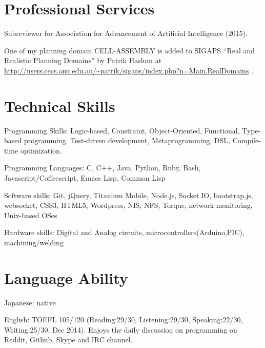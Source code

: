 \documentclass[letterpaper]{article}
\begin{document}
\renewcommand{\refname}{Publications}

\let\uline\relax
\nocite{Asai2014}
\nocite{Asai2014b}
\nocite{Asai2015}




\section{Professional Services}

Subreviewer for Association for Advancement of Artificial Intelligence (2015).

One of my planning domain CELL-ASSEMBLY is added to SIGAPS ``Real and
Realistic Planning Domains'' by Patrik Haslum at
\url{http://users.cecs.anu.edu.au/~patrik/sigaps/index.php?n=Main.RealDomains}
.

\section{Technical Skills}

\begin{CV}
 \item[Programming Skills:] Logic-based, Constraint, Object-Oriented,
 Functional, Type-based programming. Test-driven development, Metaprogramming, DSL, Compile-time optimization.
 \item[Programming Languages:] C, C++, Java, Python, Ruby, Bash,
 Javascript/Coffeescript, Emacs Lisp, Common Lisp
 \item[Software skills:] Git, jQuery, Titanium Mobile,
 Node.js, Socket.IO, bootstrap.js, websocket, CSS3, HTML5, Wordpress, NIS, NFS,
 Torque, network monitoring, Unix-based OSes
 \item[Hardware skills:] Digital and Analog circuits, microcontrollers(Arduino,PIC), machining/welding
\end{CV}

\section{Language Ability}

\begin{CV}
 \item[Japanese:] native
 \item[English:] TOEFL 105/120 (Reading:29/30, Listening:29/30,
 Speaking:22/30, Writing:25/30, Dec 2014). Enjoys the daily discussion
 on programming on Reddit, Github, Skype and IRC channel.
\end{CV}
\end{document}
